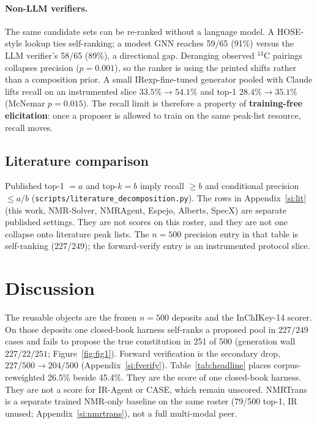 \documentclass{article}
\begin{document}
\paragraph{Non-LLM verifiers.}
The same candidate sets can be re-ranked without a language model.
A HOSE-style lookup ties self-ranking; a modest GNN reaches 59/65 (91\%)
versus the LLM verifier's 58/65 (89\%), a directional gap.
Deranging observed $^{13}$C pairings collapses precision ($p{=}0.001$),
so the ranker is using the printed shifts rather than a composition
prior.
A small IRexp-fine-tuned generator pooled with Claude lifts recall on an
instrumented slice $33.5\%\to54.1\%$ and top-1 $28.4\%\to35.1\%$
(McNemar $p{=}0.015$).
The recall limit is therefore a property of \textbf{training-free elicitation}:
once a proposer is allowed to train on the same peak-list resource,
recall moves.

\subsection{Literature comparison}
\label{sec:literature}

Published top-1 $= a$ and top-$k = b$ imply recall $\geq b$ and conditional
precision $\leq a/b$ (\texttt{scripts/literature\_decomposition.py}).
The rows in Appendix~\ref{si:lit} (this work, NMR-Solver, NMRAgent, Espejo, Alberts, SpecX) are
separate published settings.
They are not scores on this roster, and they are not one collapse onto
literature peak lists.
The $n{=}500$ precision entry in that table is self-ranking (227/249);
the forward-verify entry is an instrumented protocol slice.

\section{Discussion}
\label{sec:discussion}

The reusable objects are the frozen $n{=}500$ deposits and the InChIKey-14
scorer.
On those deposits one closed-book harness self-ranks a proposed pool in
$227/249$ cases and fails to propose the true constitution in 251 of 500
(generation wall $227/22/251$; Figure~\ref{fig:fig1}).
Forward verification is the secondary drop, $227/500 \to 204/500$
(Appendix~\ref{si:fverify}).
Table~\ref{tab:headline} places corpus-reweighted 26.5\% beside 45.4\%.
They are the score of one closed-book harness.
They are not a score for IR-Agent or CASE, which remain unscored.
NMRTrans is a separate trained NMR-only baseline on the same roster
(79/500 top-1, IR unused; Appendix~\ref{si:nmrtrans}), not a full multi-modal peer.
\end{document}
